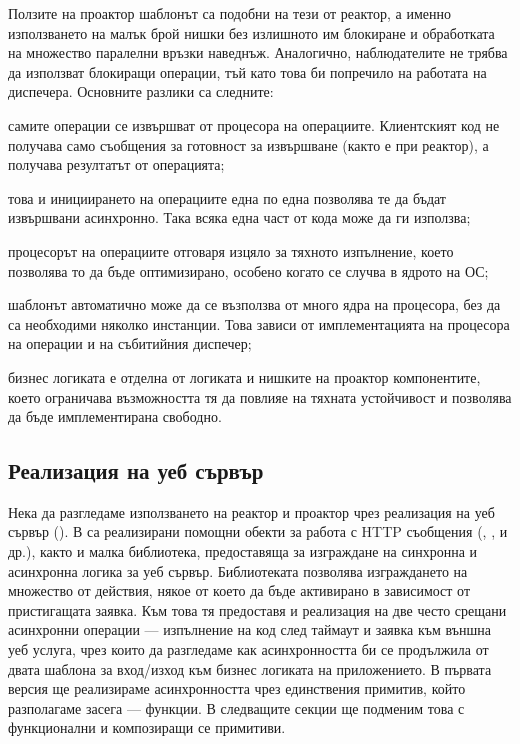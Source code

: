 Ползите на проактор шаблонът са подобни на тези от реактор, а именно използването на малък брой нишки без излишното им блокиране и обработката на множество паралелни връзки наведнъж. Аналогично, наблюдателите не трябва да използват блокиращи операции, тъй като това би попречило на работата на диспечера. Основните разлики са следните:

\begin{itemize*}
  \item самите операции се извършват от процесора на операциите. Клиентският код не получава само съобщения за готовност за извършване (както е при реактор), а получава резултатът от операцията;
  
  \item това и инициирането на операциите една по една позволява те да бъдат извършвани асинхронно. Така всяка една част от кода може да ги използва;
  
  \item процесорът на операциите отговаря изцяло за тяхното изпълнение, което позволява то да бъде оптимизирано, особено когато се случва в ядрото на ОС;
  
  \item шаблонът автоматично може да се възползва от много ядра на процесора, без да са необходими няколко инстанции. Това зависи от имплементацията на процесора на операции и на събитийния диспечер;
  
  \item бизнес логиката е отделна от логиката и нишките на проактор компонентите, което ограничава възможността тя да повлияе на тяхната устойчивост и позволява да бъде имплементирана свободно.
\end{itemize*}

\subsection{Реализация на уеб сървър}
\label{sec:implementing-a-web-server}

Нека да разгледаме използването на реактор и проактор чрез реализация на уеб сървър (). В  са реализирани помощни обекти за работа с HTTP съобщения (, ,  и др.), както и малка библиотека, предоставяща  за изграждане на синхронна и асинхронна логика за уеб сървър. Библиотеката позволява изграждането на множество от действия, някое от което да бъде активирано в зависимост от пристигащата заявка. Към това тя предоставя и реализация на две често срещани асинхронни операции — изпълнение на код след таймаут и заявка към външна уеб услуга, чрез които да разгледаме как асинхронността би се продължила от двата шаблона за вход/изход към бизнес логиката на приложението. В първата версия ще реализираме асинхронността чрез единствения примитив, който разполагаме засега —  функции. В следващите секции ще подменим това с функционални и композиращи се примитиви.

